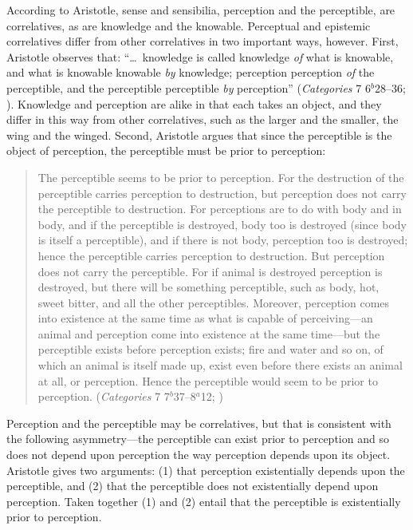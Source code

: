 According to Aristotle, sense and sensibilia, perception and the perceptible, are correlatives, as are knowledge and the knowable. Perceptual and epistemic correlatives differ from other correlatives in two important ways, however. First, Aristotle observes that: ``\ldots\ knowledge is called knowledge \emph{of} what is knowable, and what is knowable knowable \emph{by} knowledge; perception perception \emph{of} the perceptible, and the perceptible perceptible \emph{by} perception'' (\emph{Categories} 7 6\( ^{b} \)28--36; \citealt{Ackrill:1963fk}). Knowledge and perception are alike in that each takes an object, and they differ in this way from other correlatives, such as the larger and the smaller, the wing and the winged. Second, Aristotle argues that since the perceptible is the object of perception, the perceptible must be prior to perception:
\begin{quote}
    The perceptible seems to be prior to perception. For the destruction of the perceptible carries perception to destruction, but perception does not carry the perceptible to destruction. For perceptions are to do with body and in body, and if the perceptible is destroyed, body too is destroyed (since body is itself a perceptible), and if there is not body, perception too is destroyed; hence the perceptible carries perception to destruction. But perception does not carry the perceptible. For if animal is destroyed perception is destroyed, but there will be something perceptible, such as body, hot, sweet bitter, and all the other perceptibles. Moreover, perception comes into existence at the same time as what is capable of perceiving---an animal and perception come into existence at the same time---but the perceptible exists before perception exists; fire and water and so on, of which an animal is itself made up, exist even before there exists an animal at all, or perception. Hence the perceptible would seem to be prior to perception. (\emph{Categories} 7 7\( ^{b} \)37--8\( ^{a} \)12; \citealt{Ackrill:1963fk})
\end{quote}
Perception and the perceptible may be correlatives, but that is consistent with the following asymmetry---the perceptible can exist prior to perception and so does not depend upon perception the way perception depends upon its object. Aristotle gives two arguments: (1) that perception existentially depends upon the perceptible, and (2) that the perceptible does not existentially depend upon perception. Taken together (1) and (2) entail that the perceptible is existentially prior to perception. 

